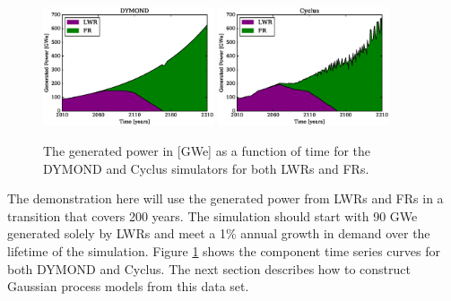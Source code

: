 \begin{figure}[htb]
\centering
\includegraphics[width=0.45\textwidth]{gwe-dymond.eps}
\includegraphics[width=0.45\textwidth]{gwe-cyclus.eps}
\caption{The generated power in [GWe] as a function of time for the DYMOND and 
Cyclus simulators for both LWRs and FRs.}
\label{gwe-simulators}
\end{figure}

The demonstration here will use the generated power from LWRs and FRs in 
a transition that covers 200 years. The simulation should start with
90 GWe generated solely by LWRs and meet a 1\% annual growth in demand over the 
lifetime of the simulation. Figure \ref{gwe-simulators} shows the component time 
series curves for both DYMOND and Cyclus. The next section describes how to
construct Gaussian process models from this data set.

\clearpage
